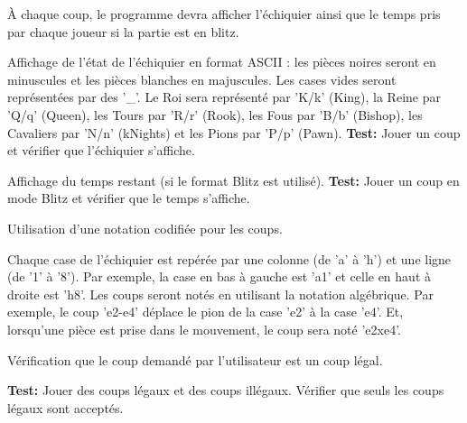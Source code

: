 \documentclass{article}
\begin{document}
\begin{needbox}
    À chaque coup, le programme devra afficher l'échiquier ainsi que le temps pris par chaque joueur si la partie est en blitz.
    \begin{subneedbox}[F26.1: Echiquier]
        Affichage de l'état de l'échiquier en format ASCII : les pièces noires seront en minuscules et les pièces blanches en majuscules. Les cases vides seront représentées par des '\_'. Le Roi sera représenté par 'K/k' (King), la Reine par 'Q/q' (Queen), les Tours par 'R/r' (Rook), les Fous par 'B/b' (Bishop), les Cavaliers par 'N/n' (kNights) et les Pions par 'P/p' (Pawn).
        \textbf{Test:} Jouer un coup et vérifier que l'échiquier s'affiche.
    \end{subneedbox}
    \begin{subneedbox}
        Affichage du temps restant (si le format Blitz est utilisé).
        \textbf{Test:} Jouer un coup en mode Blitz et vérifier que le temps s'affiche.
    \end{subneedbox}
\end{needbox}

\begin{needbox}
    Utilisation d'une notation codifiée pour les coups.
    \begin{subneedbox}
        Chaque case de l'échiquier est repérée par une colonne (de 'a' à 'h') et une ligne (de '1' à '8'). Par exemple, la case en bas à gauche est 'a1' et celle en haut à droite est 'h8'. Les coups seront notés en utilisant la notation algébrique. Par exemple, le coup 'e2-e4' déplace le pion de la case 'e2' à la case 'e4'. Et, lorsqu'une pièce est prise dans le mouvement, le coup sera noté 'e2xe4'.
    \end{subneedbox}
    \begin{subneedbox}
        Vérification que le coup demandé par l'utilisateur est un coup légal.
    \end{subneedbox}
    \textbf{Test:} Jouer des coups légaux et des coups illégaux. Vérifier que seuls les coups légaux sont acceptés.
\end{needbox}
\end{document}
